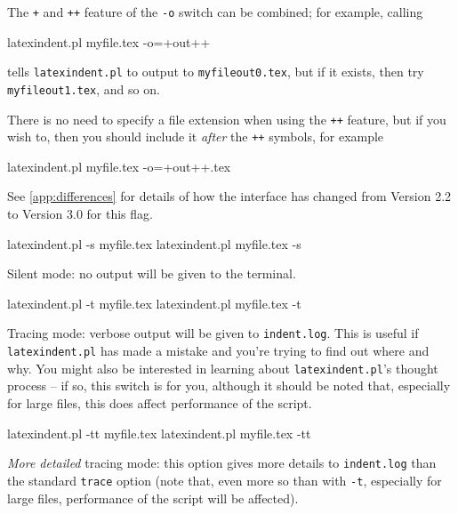 	The \texttt{+} and \texttt{++} feature of the
	\texttt{-o} switch can be combined; for example, calling
	\begin{commandshell}
latexindent.pl myfile.tex -o=+out++
\end{commandshell}
	tells \texttt{latexindent.pl} to output to \texttt{myfileout0.tex}, but if it exists, then
	try \texttt{myfileout1.tex}, and so on.

	There is no need to specify a file extension when using the \texttt{++}
	feature, but if you wish to, then you should include it \emph{after} the
	\texttt{++} symbols, for example
	\begin{commandshell}
latexindent.pl myfile.tex -o=+out++.tex
\end{commandshell}

	See \vref{app:differences} for details of how the interface has changed from Version 2.2
	to Version 3.0 for this flag.
	\begin{commandshell}
latexindent.pl -s myfile.tex
latexindent.pl myfile.tex -s
\end{commandshell}

	Silent mode: no output will be given to the terminal.

	\begin{commandshell}
latexindent.pl -t myfile.tex
latexindent.pl myfile.tex -t
\end{commandshell}

	\label{page:traceswitch}
	Tracing mode: verbose output will be given to \texttt{indent.log}. This is useful if
	\texttt{latexindent.pl} has made a mistake and you're trying to find out where and why.
	You might also be interested in learning about \texttt{latexindent.pl}'s thought process
	-- if so, this switch is for you, although it should be noted that, especially for large
	files, this does affect performance of the script.

	\begin{commandshell}
latexindent.pl -tt myfile.tex
latexindent.pl myfile.tex -tt
\end{commandshell}

	\emph{More detailed} tracing mode: this option gives more details to
	\texttt{indent.log}
	than the standard \texttt{trace} option (note that, even more so than with
	\texttt{-t}, especially for large files, performance of the script will be
	affected).


